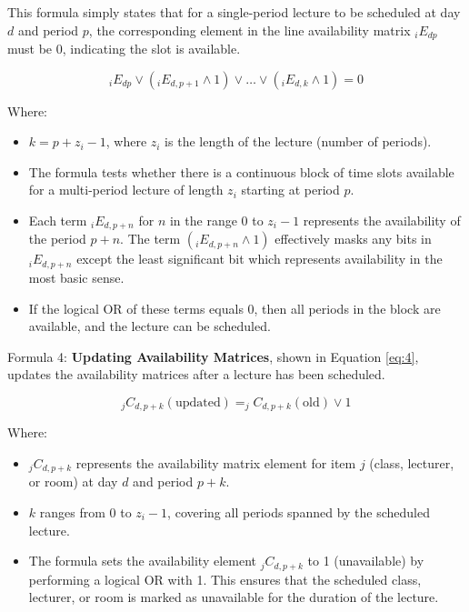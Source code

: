 This formula simply states that for a single-period lecture to be scheduled at day \( d \) and period \( p \), the corresponding element in the line availability matrix \( _iE_{dp} \) must be 0, indicating the slot is available.

\begin{equation}
\label{eq:3}
_iE_{dp} \vee (_iE_{d,p+1} \wedge 1) \vee \dots \vee (_iE_{d,k} \wedge 1) = 0
\end{equation}

Where:
\begin{itemize}
    \item \( k = p + z_i - 1 \), where \( z_i \) is the length of the lecture (number of periods).
    \item The formula tests whether there is a continuous block of time slots available for a multi-period lecture of length \( z_i \) starting at period \( p \).
    \item  Each term \( _iE_{d,p+n} \) for \( n \) in the range \( 0 \) to \( z_i-1 \) represents the availability of the period \( p+n \).  The term \(  (_iE_{d,p+n} \wedge 1)  \) effectively masks any bits in  \( _iE_{d,p+n} \) except the least significant bit which represents availability in the most basic sense.
    \item If the logical OR of these terms equals 0, then all periods in the block are available, and the lecture can be scheduled.
\end{itemize}

Formula 4: \textbf{Updating Availability Matrices}, shown in Equation \ref{eq:4}, updates the availability matrices after a lecture has been scheduled.

\begin{equation}
\label{eq:4}
_jC_{d, p+k} (\text{updated}) = _jC_{d, p+k} (\text{old}) \vee 1
\end{equation}

Where:
\begin{itemize}
    \item \( _jC_{d, p+k} \) represents the availability matrix element for item \( j \) (class, lecturer, or room) at day \( d \) and period \( p+k \).
    \item \( k \) ranges from 0 to \( z_i - 1 \), covering all periods spanned by the scheduled lecture.
    \item The formula sets the availability element \( _jC_{d, p+k} \) to 1 (unavailable) by performing a logical OR with 1.
This ensures that the scheduled class, lecturer, or room is marked as unavailable for the duration of the lecture.
\end{itemize}

